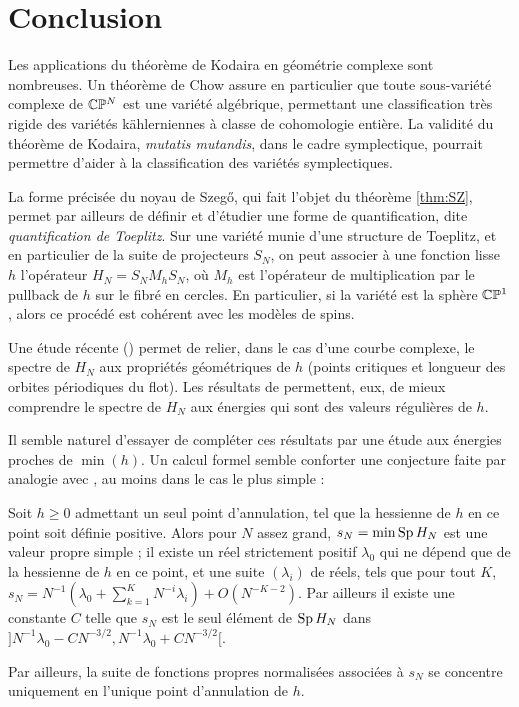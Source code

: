 \chapter*{Conclusion}
Les applications du théorème de Kodaira en géométrie complexe sont nombreuses. Un théorème de Chow assure en particulier que toute sous-variété complexe de $\mathbb{C}\mathbb{P}^N$ est une variété algébrique, permettant une classification très rigide des variétés k\"ahlerniennes à classe de cohomologie entière. La validité du théorème de Kodaira, \emph{mutatis mutandis}, dans le cadre symplectique, pourrait permettre d'aider à la classification des variétés symplectiques.

La forme précisée du noyau de Szeg\H{o}, qui fait l'objet du théorème \ref{thm:SZ}, permet par ailleurs de définir et d'étudier une forme de quantification, dite \emph{quantification de Toeplitz}. Sur une variété munie d'une structure de Toeplitz, et en particulier de la suite de projecteurs $S_N$, on peut associer à une fonction lisse $h$ l'opérateur $H_N=S_NM_hS_N$, où $M_h$ est l'opérateur de multiplication par le pullback de $h$ sur le fibré en cercles. En particulier, si la variété est la sphère $\mathbb{C}\mathbb{P}^1$, alors ce procédé est cohérent avec les modèles de spins.

Une étude récente (\cite{le2014theorie}) permet de relier, dans le cas d'une courbe complexe, le spectre de $H_N$ aux propriétés géométriques de $h$ (points critiques et longueur des orbites périodiques du flot). Les résultats de \cite{borthwick1998semiclassical} permettent, eux, de mieux comprendre le spectre de $H_N$ aux énergies qui sont des valeurs régulières de $h$. 

Il semble naturel d'essayer de compléter ces résultats par une étude aux énergies proches de $\min(h)$. Un calcul formel semble conforter une conjecture faite par analogie avec \cite{helffer1988semi}, au moins dans le cas le plus simple :
\begin{conj}
	Soit $h\geq 0$ admettant un seul point d'annulation, tel que la hessienne de $h$ en ce point soit définie positive. Alors pour $N$ assez grand, $s_N=\min \operatorname{Sp} H_N$ est une valeur propre simple ; il existe un réel strictement positif $\lambda_0$ qui ne dépend que de la hessienne de $h$ en ce point, et une suite $(\lambda_i)$ de réels, tels que pour tout $K$, $s_N=N^{-1}(\lambda_0+\sum_{k=1}^K N^{-i}\lambda_i) + O(N^{-K-2})$. Par ailleurs il existe une constante $C$ telle que $s_N$ est le seul élément de $\operatorname{Sp} H_N$ dans $]N^{-1}\lambda_0-CN^{-3/2},N^{-1}\lambda_0+CN^{-3/2}[$.
	
	Par ailleurs, la suite de fonctions propres normalisées associées à $s_N$ se concentre uniquement en l'unique point d'annulation de $h$.
\end{conj}

